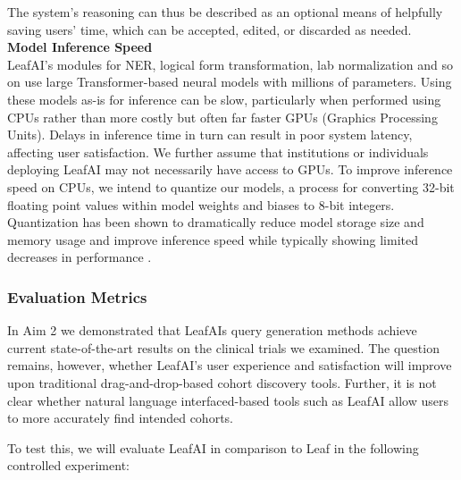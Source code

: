 \documentclass[../main.tex]{subfiles}
\begin{document}
The system's reasoning can thus be described as an optional means of helpfully saving users' time, which can be accepted, edited, or discarded as needed. \\

\noindent \textbf{Model Inference Speed} \\
LeafAI's modules for NER, logical form transformation, lab normalization and so on use large Transformer-based neural models \cite{vaswani2017attention} with millions of parameters. Using these models as-is for inference can be slow, particularly when performed using CPUs rather than more costly but often far faster GPUs (Graphics Processing Units). Delays in inference time in turn can result in poor system latency, affecting user satisfaction. We further assume that institutions or individuals deploying LeafAI may not necessarily have access to GPUs. To improve inference speed on CPUs, we intend to quantize our models, a process for converting 32-bit floating point values within model weights and biases to 8-bit integers. Quantization has been shown to dramatically reduce model storage size and memory usage and improve inference speed while typically showing limited decreases in performance \cite{hubara2017quantized}. 

\subsubsection{Evaluation Metrics}

In Aim 2 we demonstrated that LeafAIs query generation methods achieve current state-of-the-art results on the clinical trials we examined. The question remains, however, whether LeafAI's user experience and satisfaction will improve upon traditional drag-and-drop-based cohort discovery tools. Further, it is not clear whether natural language interfaced-based tools such as LeafAI allow users to more accurately find intended cohorts.

To test this, we will evaluate LeafAI in comparison to Leaf in the following controlled experiment: 
\end{document}

